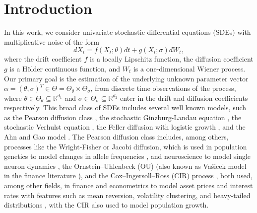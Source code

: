 \documentclass[a4paper,12pt]{article}
\numberwithin{equation}{section}
\theoremstyle{plain}
\theoremstyle{definition}
\begin{document}
\section{Introduction}\label{sec:intro}
In this work, we consider univariate stochastic differential equations (SDEs) with multiplicative noise of the form
\begin{equation}\label{eqn:the sde}
    dX_t=f(X_t;\theta)dt+g(X_t;\sigma)dW_t,
\end{equation}
where the drift coefficient $f$ is a locally Lipschitz function, the diffusion coefficient $g$ is a H\"older continuous function, and $W_t$ is a one-dimensional Wiener process. Our primary goal is the estimation of the underlying unknown parameter vector $\alpha=(\theta,\sigma)^T\in\Theta=\Theta_{\theta}\times\Theta_{\sigma}$, from discrete time observations of the process, where $\theta\in \Theta_{\theta}\subseteq\mathbb{R}^{d_1}$ and $\sigma\in\Theta_{\sigma}\subseteq\mathbb{R}^{d_2}$  enter in the drift and diffusion coefficients respectively. This broad class of SDEs includes several well known models, such as the Pearson diffusion class \cite{forman_pearson_2008}, the stochastic Ginzburg-Landau equation \cite{ginzburg_superconductivity_2009}, the stochastic Verhulst equation \cite{verhulst_recherches_1845}, the Feller diffusion with logistic growth \cite{lambert_branching_2005}, and the Ahn and Gao model \cite{ahn_parametric_1999}. The Pearson diffusion class includes, among others, processes like the Wright-Fisher or Jacobi diffusion, which is used in population genetics to model changes in allele frequencies \cite{casanova_duality_2017,koskela_bernoulli_2024}, and neuroscience to model single neuron dynamics \cite{donofrio_jacobi_2018}, the Ornstein–Uhlenbeck (OU) \cite{uhlenbeck_theory_1930} (also known as Va\v{s}icek
 model in the finance literature \cite{vasicek_equilibrium_1977}), and the Cox–Ingersoll–Ross (CIR) process \cite{cox_theory_1985}, both used, among other fields, in finance and econometrics to model asset prices and interest rates with features such as mean reversion, volatility clustering, and heavy-tailed distributions \cite{cox_theory_1985}, with the CIR also used to model population
growth. 
\end{document}
